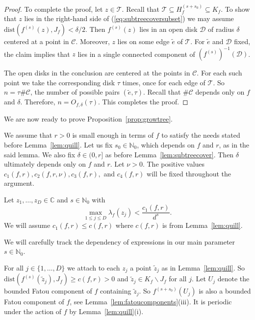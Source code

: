 \documentclass[12pt,oneside,a4]{amsart}
\newcommand{\IC}{\mathbb{C}}
\newcommand{\IN}{\mathbb{N}}
\renewcommand{\cD}{\mathcal{D}}
\newcommand{\cT}{\mathcal{T}}
\numberwithin{maincounter}{section}
\numberwithin{equation}{section}
\renewcommand{\subset}{\subseteq}
\newcommand{\ssm}{\smallsetminus}
\begin{document}
\begin{proof}
  To  complete the proof, let 
  $z\in  \cT$. Recall that $\cT\subset H_f^{(s+s_0)}\subset K_f$.
  To show that $z$ lies in the right-hand side of
  (\ref{eq:subtreecoversubset}) we may assume
  $\mathrm{dist}(f^{(s)}(z),J_f) <\delta / 2$.
  Then $f^{(s)}(z)$ lies
  in an open  disk $\cD$ of radius $\delta$ centered at a point in
  $\mathcal{C}$.
  Moreover,
  $z$ lies on some edge $\tilde e$ of $\cT$. 
  For $\tilde e$ and $\cD$ fixed, 
  the claim implies that $z$ lies in a single connected component of 
  $(f^{(s)})^{-1}(\cD)$.
  
  The open disks in the conclusion are centered at the points in
  $\mathcal{C}$. For each such point we take the corresponding disk
  $\tau$ times, once for each edge of $\cT$. So $n = \tau \#\mathcal{C}$, 
  the number of possible pairs $(\tilde  e,\tau)$.
  Recall that $\#\mathcal{C}$ depends only on $f$ and $\delta$. Therefore, $n =
  O_{f,\delta}(\tau)$.  This completes
  the proof. 
\end{proof}

We are now ready to prove Proposition~\ref{prop:growtree}.


We assume that  $r>0$ is small enough in terms of $f$ to
satisfy the needs stated before Lemma~\ref{lem:quill}. Let us fix
$s_0\in\IN_0$, which depends on $f$ and $r$, as in the said
lemma. We also fix  $\delta \in (0,r]$
as before Lemma~\ref{lem:subtreecover}.
Then $\delta$ ultimately depends  only on $f$ and $r$.
Let $\nu > 0$.
The positive values $c_1(f,r),
c_2(f,r,\nu),c_3(f,r),$ and $c_4(f,r)$ will be
fixed throughout the argument. 

Let $z_1,\ldots,z_D\in\IC$ and $s\in\IN_0$ with
\begin{equation*}
  \max_{1\le j\le D} \lambda_f(z_j)< \frac{c_1(f,r)}{d^s}.
\end{equation*}
We will assume {$c_1(f,r)\le c(f,r)$} where
$c(f,r)$ is from Lemma~\ref{lem:quill}.

We will carefully track the dependency of expressions in our main
parameter $s\in\IN_0$.




For all $j\in \{1,\ldots,D\}$ we attach to each $z_j$ a point $\tilde
z_j$ as in Lemma~\ref{lem:quill}. So $\mathrm{dist}(f^{(s)}(\tilde
z_j),J_f)\ge c(f,r)>0$ and $\tilde z_j\in K_f\ssm J_f$
for all $j$. Let $U_j$ denote the bounded Fatou
component of $f$ containing $\tilde z_j$. So $f^{(s+s_0)}(U_j)$ is
also a bounded Fatou component of $f$, see
Lemma~\ref{lem:fatoucomponents}(iii). 
It is periodic under the action of
$f$ by Lemma~\ref{lem:quill}(i).
\end{document}
